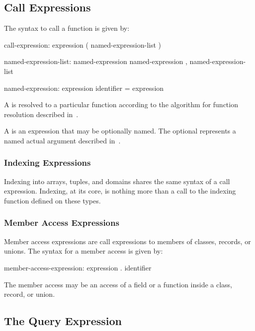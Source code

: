 \subsection{Call Expressions}
\label{Call_Expressions}

The syntax to call a function is given by:
\begin{syntax}
call-expression:
  expression ( named-expression-list )

named-expression-list:
  named-expression
  named-expression , named-expression-list

named-expression:
  expression
  identifier = expression
\end{syntax}

A  is resolved to a particular function
according to the algorithm for function resolution described
in~.

A  is an expression that may be optionally
named.  The optional  represents a named actual
argument described in~.

\subsubsection{Indexing Expressions}
\label{Indexing_Expressions}

Indexing into arrays, tuples, and domains shares the same syntax of a
call expression.  Indexing, at its core, is nothing more than a call
to the indexing function defined on these types.

\subsubsection{Member Access Expressions}
\label{Member_Access_Expressions}

Member access expressions are call expressions to members of classes,
records, or unions.  The syntax for a member access is given by:
\begin{syntax}
member-access-expression:
  expression . identifier
\end{syntax}
The member access may be an access of a field or a function inside a
class, record, or union.

\subsection{The Query Expression}
\label{The_Query_Expression}


